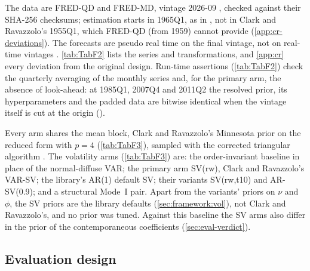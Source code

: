The data are FRED-QD and FRED-MD, vintage 2026-09 \citep{mccracken2021fredqd,mccracken2016fredmd},
checked against their SHA-256 checksums; estimation starts in 1965Q1, as in
\citet{clark2011realtime}, not in Clark and Ravazzolo's 1955Q1, which FRED-QD (from 1959) cannot
provide (\cref{app:cr-deviations}). %
The forecasts are pseudo real time on the
final vintage, not on real-time vintages \citep{croushore2001realtime}. \cref{tab:TabF2} lists the
series and transformations, and \cref{app:cr} every deviation from the original design. %
Run-time assertions (\cref{tab:TabF2}) check the quarterly averaging of the monthly series and,
for the primary arm, the absence of look-ahead: at 1985Q1, 2007Q4 and 2011Q2 the resolved prior,
its hyperparameters and the padded data are bitwise identical when the vintage itself is cut at the
origin ().

Every arm shares the mean block, Clark and Ravazzolo's Minnesota prior on the reduced form with
$p = 4$ (\cref{tab:TabF3}), sampled with the corrected triangular algorithm
\citep{carriero2022corrigendum}. %
The volatility arms (\cref{tab:TabF3}) are: %
the order-invariant baseline  \citep{chan2022asymmetric} in place
of the normal-diffuse VAR; the primary arm SV(rw), Clark and Ravazzolo's VAR-SV; the library's AR(1)
default SV; their variants SV(rw,t10) and AR-SV(0.9); and a structural Mode~I pair. Apart from the
variants' priors on $\nu$ and $\phi$, the SV priors are the library defaults
(\cref{sec:framework:vol}), not Clark and Ravazzolo's, and no prior was tuned. Against this
baseline the SV arms also differ in the prior of the contemporaneous coefficients
(\cref{sec:eval-verdict}). %

\subsection{Evaluation design}\label{sec:replication-design}

